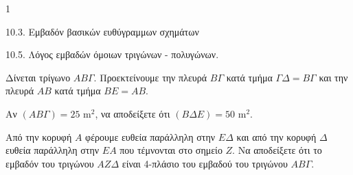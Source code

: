 \begin{ylh}{1}
    \item 10.3. Εμβαδόν βασικών ευθύγραμμων σχημάτων
    \item 10.5. Λόγος εμβαδών όμοιων τριγώνων - πολυγώνων.
\end{ylh}
\begin{figure}
\centering
{}
\end{figure}
Δίνεται τρίγωνο $AB\Gamma$. Προεκτείνουμε την πλευρά $B\Gamma$ κατά τμήμα $\Gamma\Delta=B\Gamma$ και την πλευρά $AB$ κατά τμήμα $BE=AB$.
\begin{alist}
\item Αν $(AB\Gamma)= 25 \text{ m}^2$, να αποδείξετε ότι $(B\Delta E)=50 \text{ m}^2$. 
\item Από την κορυφή $A$ φέρουμε ευθεία παράλληλη στην $E\Delta$ και από την κορυφή $\Delta$ ευθεία παράλληλη στην $EA$ που τέμνονται στο σημείο $Z$. Να αποδείξετε ότι το εμβαδόν του τριγώνου $AZ\Delta$ είναι 4-πλάσιο του εμβαδού του τριγώνου $AB\Gamma$. 
\end{alist}
